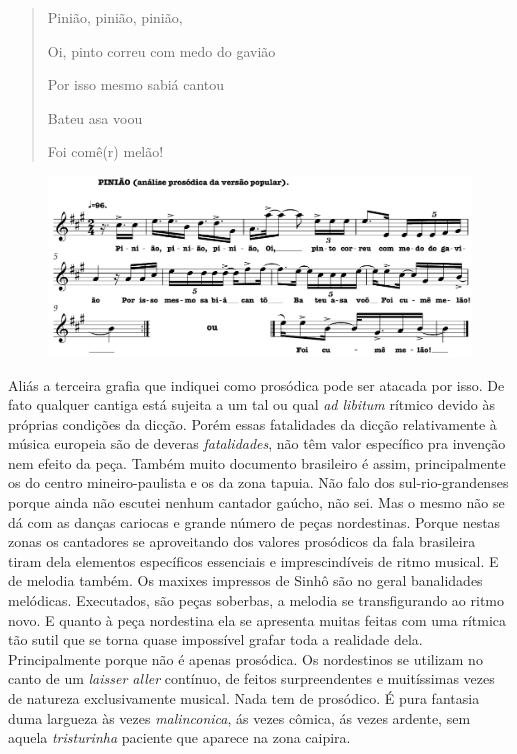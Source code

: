 \begin{quote}
\forceindent{}Pinião, pinião, pinião,

Oi, pinto correu com medo do gavião

Por isso mesmo sabiá cantou

Bateu asa voou

Foi comê(r) melão!
\end{quote}

 \begin{figure}[H]
 \includegraphics[width=\textwidth]{./imgs/fig3.pdf}
 \end{figure}

Aliás a terceira grafia que indiquei como prosódica pode ser atacada por
isso. De fato qualquer cantiga está sujeita a um tal ou qual \textit{ad
libitum} rítmico devido às próprias condições da dicção. Porém essas
fatalidades da dicção relativamente à música europeia são de deveras
\textit{fatalidades}, não têm valor específico pra invenção nem efeito da
peça. Também muito documento brasileiro é assim, principalmente os do
centro mineiro-paulista e os da zona tapuia. Não falo dos
sul-rio-grandenses porque ainda não escutei nenhum cantador gaúcho, não
sei. Mas o mesmo não se dá com as danças cariocas e grande número de
peças nordestinas. Porque nestas zonas os cantadores se aproveitando dos
valores prosódicos da fala brasileira tiram dela elementos específicos
essenciais e imprescindíveis de ritmo musical. E de melodia também. Os
maxixes impressos de Sinhô são no geral banalidades melódicas.
Executados, são peças soberbas, a melodia se transfigurando ao ritmo
novo. E quanto à peça nordestina ela se apresenta muitas feitas com uma
rítmica tão sutil que se torna quase impossível grafar toda a realidade
dela. Principalmente porque não é apenas prosódica. Os nordestinos se
utilizam no canto de um \textit{laisser aller} contínuo, de feitos
surpreendentes e muitíssimas vezes de natureza exclusivamente musical.
Nada tem de prosódico. É pura fantasia duma largueza às vezes
\textit{malinconica}, ás vezes cômica, ás vezes ardente, sem aquela \textit{tristurinha}
paciente que aparece na zona caipira.

